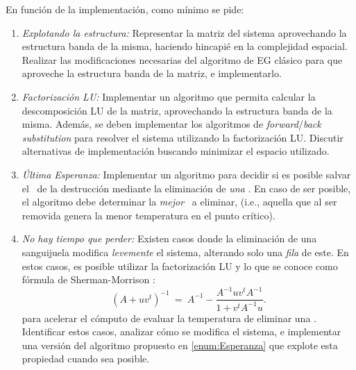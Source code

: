En funci\'on de la implementaci\'on, como m\'inimo se pide:
\begin{enumerate}
\item \textit{Explotando la estructura:} Representar la matriz del sistema aprovechando la estructura banda de la misma, haciendo 
hincapi\'e en la complejidad espacial. Realizar las modificaciones necesarias del algoritmo de EG cl\'asico para que aproveche la estructura
banda de la matriz, e implementarlo. \label{enum:EGbanda}
\item \textit{Factorizaci\'on LU:} Implementar un algoritmo que permita calcular la descomposici\'on LU de la matriz, aprovechando la estructura 
banda de la misma. Adem\'as, se deben implementar los algoritmos de \textit{forward}/\textit{back substitution} para resolver el sistema utilizando
la factorizaci\'on LU. Discutir alternativas de implementaci\'on buscando minimizar el espacio utilizado. \label{enum:LU}
\item \textit{\'Ultima Esperanza:} Implementar un algoritmo para decidir si es posible salvar el \objeto\ de la destrucci\'on mediante 
la eliminaci\'on de \emph{una} \atacante. En caso de ser posible, el algoritmo debe determinar la \emph{mejor} \atacante\ a eliminar,
(i.e., aquella que al ser removida genera la menor temperatura en el punto cr\'itico). \label{enum:Esperanza}
\item \textit{No hay tiempo que perder:} Existen casos donde la eliminaci\'on de una sanguijuela modifica \textit{levemente} el sistema,
alterando solo una \emph{fila} de este. En estos casos, es posible utilizar la factorizaci\'on LU y lo que se conoce como f\'ormula de
Sherman-Morrison \cite{ShermanMorrison}:\\
\begin{equation}
	(A+ uv^t)^{-1} \ =\ A^{-1} - \frac{ A^{-1} u v^t A^{-1} }{1+v^t A^{-1}u}.\label{eq:sm}
\end{equation}
para acelerar el c\'omputo de evaluar la temperatura de eliminar una \atacante. Identificar estos casos, analizar
c\'omo se modifica el sistema, e implementar una versi\'on del algoritmo propuesto en \ref{enum:Esperanza} que explote esta propiedad cuando sea posible. \label{enum:SM}
\end{enumerate}
\vspace*{-0.3cm}
